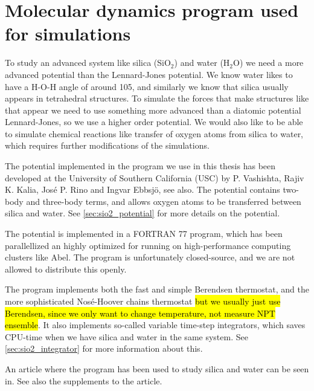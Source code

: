 \chapter{Molecular dynamics program used for simulations}
To study an advanced system like silica (SiO$_2$) and water (H$_2$O) we need a more advanced potential than the Lennard-Jones potential. We know water likes to have a H-O-H angle of around 105, and similarly we know that silica usually appears in tetrahedral structures. To simulate the forces that make structures like that appear we need to use something more advanced than a diatomic potential Lennard-Jones, so we use a higher order potential. We would also like to be able to simulate chemical reactions like transfer of oxygen atoms from silica to water, which requires further modifications of the simulations.

The potential implemented in the program we use in this thesis has been developed at the University of Southern California (USC) by P. Vashishta, Rajiv K. Kalia, José P. Rino and Ingvar Ebbsj\"o\cite{vashishta1990interaction}, see also\cite{shekhar2013nanobubble,shekhar2013nanobubble_supplements}. The potential contains two-body and three-body terms, and allows oxygen atoms to be transferred between silica and water. See \cref{sec:sio2_potential} for more details on the potential.

The potential is implemented in a FORTRAN 77 program, which has been parallellized an highly optimized for running on high-performance computing clusters like Abel. The program is unfortunately closed-source, and we are not allowed to distribute this openly.

The program implements both the fast and simple Berendsen thermostat, and the more sophisticated Nos\'e-Hoover chains thermostat \hl{but we usually just use Berendsen, since we only want to change temperature, not measure NPT ensemble}. It also implements so-called variable time-step integrators, which saves CPU-time when we have silica and water in the same system. See \cref{sec:sio2_integrator} for more information about this.

An article where the program has been used to study silica and water can be seen in\cite{shekhar2013nanobubble}. See also the supplements to the article\cite{shekhar2013nanobubble_supplements}.



